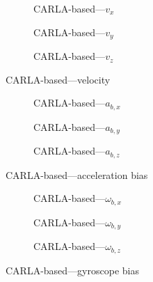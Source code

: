 \begin{figure}[H]
    \centering
    \begin{subfigure}{0.3\textwidth}
        
        \caption{CARLA-based---$v_x$}
    \end{subfigure}
    \hfill
    \begin{subfigure}{0.3\textwidth}
        
        \caption{CARLA-based---$v_y$}
    \end{subfigure}
    \hfill
    \begin{subfigure}{0.3\textwidth}
        
        \caption{CARLA-based---$v_z$}
    \end{subfigure}
    \caption{CARLA-based---velocity}\label{fig:carla-vel}
\end{figure}

\begin{figure}[H]
    \centering
    \begin{subfigure}{0.3\textwidth}
        
        \caption{CARLA-based---$a_{b,x}$}
    \end{subfigure}
    \hfill
    \begin{subfigure}{0.3\textwidth}
        
        \caption{CARLA-based---$a_{b,y}$}
    \end{subfigure}
    \hfill
    \begin{subfigure}{0.3\textwidth}
        
        \caption{CARLA-based---$a_{b,z}$}
    \end{subfigure}
    \caption{CARLA-based---acceleration bias}\label{fig:carla-abias}
\end{figure}

\begin{figure}[H]
    \centering
    \begin{subfigure}{0.3\textwidth}
        
        \caption{CARLA-based---$\omega_{b,x}$}
    \end{subfigure}
    \hfill
    \begin{subfigure}{0.3\textwidth}
        
        \caption{CARLA-based---$\omega_{b,y}$}
    \end{subfigure}
    \hfill
    \begin{subfigure}{0.3\textwidth}
        
        \caption{CARLA-based---$\omega_{b,z}$}
    \end{subfigure}
    \caption{CARLA-based---gyroscope bias}\label{fig:carla-gbias}
\end{figure}

